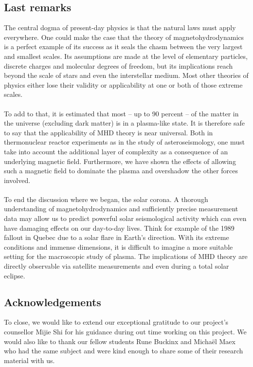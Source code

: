 \subsection*{Last remarks}

The central dogma of present-day physics is that the natural laws must apply everywhere. One could make the case that the theory of magnetohydrodynamics is a perfect example of its success as it seals the chasm between the very largest and smallest scales. Its assumptions are made at the level of elementary particles, discrete charges and molecular degrees of freedom, but its implications reach beyond the scale of stars and even the interstellar medium. Most other theories of physics either lose their validity or applicability at one or both of those extreme scales.\\
\\
To add to that, it is estimated that most – up to 90 percent \cite{notes-principles-MHD}– of the matter in the universe (excluding dark matter) is in a plasma-like state. It is therefore safe to say that the applicability of MHD theory is near universal. Both in thermonuclear reactor experiments as in the study of asteroseismology, one must take into account the additional layer of complexity as a consequence of an underlying magnetic field. Furthermore, we have shown the effects of allowing such a magnetic field to dominate the plasma and overshadow the other forces involved.\\ 
\\
To end the discussion where we began, the solar corona. A thorough understanding of magnetohydrodynamics and sufficiently precise measurement data may allow us to predict powerful solar seismological activity which can even have damaging effects on our day-to-day lives. Think for example of the 1989 fallout in Quebec due to a solar flare in Earth’s direction. With its extreme conditions and immense dimensions, it is difficult to imagine a more suitable setting for the macroscopic study of plasma. The implications of MHD theory are directly observable via satellite measurements and even during a total solar eclipse. 

\subsection*{Acknowledgements}
To close, we would like to extend our exceptional gratitude to our project’s counsellor Mijie Shi for his guidance during out time working on this project. We would also like to thank our fellow students Rune Buckinx and Michaël Maex who had the same subject and were kind enough to share some of their research material with us.
